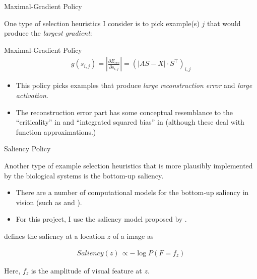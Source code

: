 \documentclass{beamer}
\begin{document}
\begin{frame}{Maximal-Gradient Policy}

One type of selection heuristics I consider is to pick example(s) $j$ that would produce the \emph{largest gradient}:


\begin{beamerboxesrounded}[lower=lowyellow,upper=upyellow,shadow=true]{Maximal-Gradient Policy}
\begin{align*}
g(s_{i, j}) = \left|\frac{\partial E_{rec}}{\partial s_{i,j}}\right| = (|AS - X| \cdot S^\intercal )_{i,j}
\end{align*}
\end{beamerboxesrounded}

\begin{itemize}
	\item This policy picks examples that produce \emph{large reconstruction error} and \emph{large activation}.
	\item The reconstruction error part has some conceptual resemblance to the ``criticality'' in \citep{Zhang:1994uy} and ``integrated squared bias'' in \citep{Plutowski:1996vv} (although these deal with function approximations.)
\end{itemize}

\end{frame}



\begin{frame}{Saliency Policy}

Another type of example selection heuristics that is more plausibly implemented by the biological systems is the bottom-up saliency.

\begin{itemize}
	\item There are a number of computational models for the bottom-up saliency in vision (such as \citet{Itti:2002tq} and \citet{Hou:2007tx}).

	\item For this project, I use the saliency model proposed by \citet{Zhang2008}.
\end{itemize}

\citet{Zhang2008} defines the saliency at a location $z$ of a image as

\begin{align*}
	Saliency(z) \, \propto - \log P(F = f_z)
\end{align*}

Here, $f_z$ is the amplitude of visual feature at $z$.
\end{frame}
\end{document}
